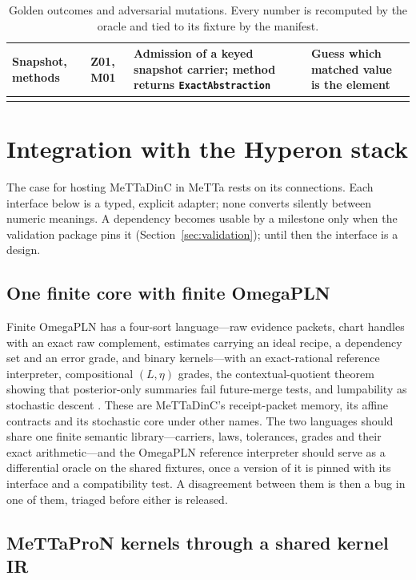 \documentclass[11pt]{article}
\newcommand{\code}[1]{\texttt{#1}}
\theoremstyle{definition}
\theoremstyle{plain}
\begin{document}
{\begin{longtable}{>{\raggedright\arraybackslash}p{2.6cm}>{\raggedright\arraybackslash}p{1.5cm}>{\raggedright\arraybackslash}p{5.4cm}>{\raggedright\arraybackslash}p{4.2cm}}
Snapshot, methods & Z01, M01 & Admission of a keyed snapshot carrier; method returns \code{ExactAbstraction} & Guess which matched value is the element\\
\bottomrule
\caption{Golden outcomes and adversarial mutations. Every number is recomputed by the oracle and
tied to its fixture by the manifest.}\label{tab:golden}
\end{longtable}}

\section{Integration with the Hyperon stack}\label{sec:integration}

The case for hosting MeTTaDinC in MeTTa rests on its connections. Each interface below is a typed,
explicit adapter; none converts silently between numeric meanings. A dependency becomes usable by a
milestone only when the validation package pins it (Section~\ref{sec:validation}); until then the
interface is a design.

\subsection{One finite core with finite OmegaPLN}

Finite OmegaPLN has a four-sort language---raw evidence packets, chart handles with an exact raw
complement, estimates carrying an ideal recipe, a dependency set and an error grade, and binary
kernels---with an exact-rational reference interpreter, compositional $(L,\eta)$ grades, the
contextual-quotient theorem showing that posterior-only summaries fail future-merge tests, and
lumpability as stochastic descent \cite{omegapln}. These are MeTTaDinC's receipt-packet memory, its
affine contracts and its stochastic core under other names. The two languages should share one
finite semantic library---carriers, laws, tolerances, grades and their exact arithmetic---and the
OmegaPLN reference interpreter should serve as a differential oracle on the shared fixtures, once a
version of it is pinned with its interface and a compatibility test. A disagreement between them is
then a bug in one of them, triaged before either is released.

\subsection{MeTTaProN kernels through a shared kernel IR}
\end{document}

